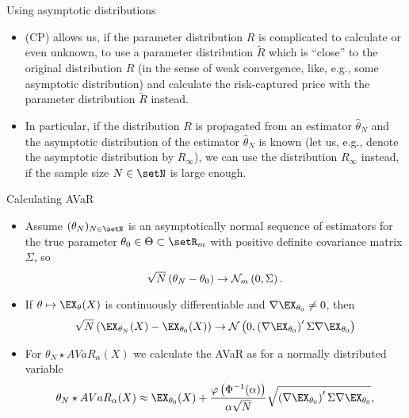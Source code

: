 {Using asymptotic distributions}
\begin{itemize}
\item (CP) allows us, if the parameter distribution $R$ is complicated to calculate or even unknown, to use a parameter distribution $\tilde{R}$ which is ``close'' to the original distribution $R$ (in the sense of weak convergence, like, e.g., some asymptotic distribution) and calculate the risk-captured price with the parameter distribution $\tilde{R}$ instead.
\item In particular, if the distribution $R$ is propagated from an estimator $\hat{\theta}_N$ and the asymptotic distribution of the estimator $\hat{\theta}_N$ is known (let us, e.g., denote the asymptotic distribution by $R_\infty$), we can use the distribution $R_\infty$ instead, if the sample size $N\in\setN$ is large enough.
\end{itemize}



{Calculating AVaR}
\begin{itemize}
\item Assume $(\theta_N)_{N \in \setN}$ is an asymptotically normal sequence of estimators for the true parameter $\theta_0 \in \Theta \subset \setR_m$  with positive definite covariance matrix $\Sigma$, so
$$
\sqrt{N}\left(\theta_N -\theta_0\right) \rightarrow {\cal N}_m \left(0,\Sigma\right).
$$
\item If $\theta \mapsto \EX_\theta(X)$ is continuously differentiable and $\nabla  \EX_{\theta_0} \not =0$, then
$$
\sqrt{N}\left(\EX_{\theta_N}(X)-\EX_{\theta_0}(X)\right) \rightarrow {\cal N}\left(0, \left(\nabla \EX_{\theta_0}\right)' \Sigma \nabla \EX_{\theta_0}\right)
$$
\item For $\theta_N \star AVaR_\alpha(X)$ we calculate the AVaR as for a normally distributed variable
$$
\theta_N \star AVaR_\alpha(X) \approx \EX_{\theta_0}(X) + \frac{\varphi\left(\Phi^{-1}(\alpha)\right)}{\alpha\sqrt{N}} \sqrt{\left(\nabla \EX_{\theta_0}\right)' \Sigma \nabla \EX_{\theta_0}},
$$
\end{itemize}






